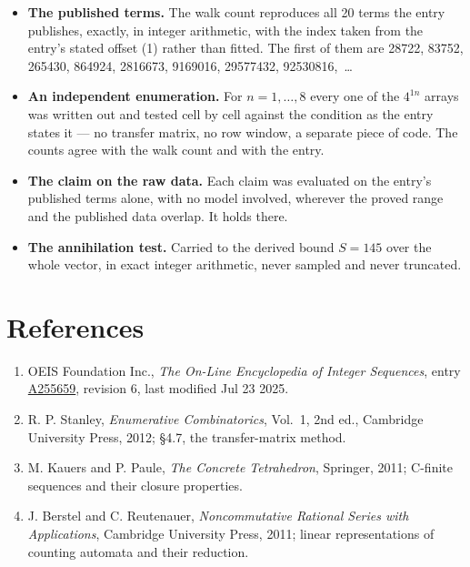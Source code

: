 \documentclass[11pt]{article}
\theoremstyle{definition}
\begin{document}
\begin{itemize}

\item {\bfseries The published terms.} The walk count reproduces all 20 terms the entry publishes, exactly, in integer arithmetic, with the index taken from the entry's stated offset (1) rather than fitted. The first of them are 28722, 83752, 265430, 864924, 2816673, 9169016, 29577432, 92530816,~\dots

\item {\bfseries An independent enumeration.} For $n = 1,\dots,8$ every one of the $4^{1n}$ arrays was written out and tested cell by cell against the condition as the entry states it --- no transfer matrix, no row window, a separate piece of code. The counts agree with the walk count and with the entry.

\item {\bfseries The claim on the raw data.} Each claim was evaluated on the entry's published terms alone, with no model involved, wherever the proved range and the published data overlap. It holds there.

\item {\bfseries The annihilation test.} Carried to the derived bound $S = 145$ over the whole vector, in exact integer arithmetic, never sampled and never truncated.

\end{itemize}

\section{References}

\begin{enumerate}

\item OEIS Foundation Inc., \emph{The On-Line Encyclopedia of Integer Sequences}, entry \href{https://oeis.org/A255659}{A255659}, revision 6, last modified Jul 23 2025.

\item R. P. Stanley, \emph{Enumerative Combinatorics}, Vol.~1, 2nd ed., Cambridge University Press, 2012; \S4.7, the transfer-matrix method.

\item M. Kauers and P. Paule, \emph{The Concrete Tetrahedron}, Springer, 2011; C-finite sequences and their closure properties.

\item J. Berstel and C. Reutenauer, \emph{Noncommutative Rational Series with Applications}, Cambridge University Press, 2011; linear representations of counting automata and their reduction.

\end{enumerate}
\end{document}
